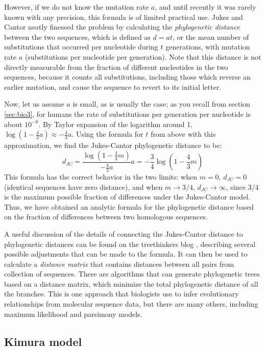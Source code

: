 \documentclass[
  letterpaper,
  DIV=11,
  numbers=noendperiod]{scrreprt}
\begin{document}
However, if we do not know the mutation rate \(a\), and until recently
it was rarely known with any precision, this formula is of limited
practical use. Jukes and Cantor neatly finessed the problem by
calculating the \emph{phylogenetic distance} between the two sequences,
which is defined as \(d = a t\), or the mean number of substitutions
that occurred per nucleotide during \(t\) generations, with mutation
rate \(a\) (substitutions per nucleotide per generation). Note that this
distance is not directly measurable from the fraction of different
nucleotides in the two sequences, because it counts all substitutions,
including those which reverse an earlier mutation, and cause the
sequence to revert to its initial letter.

Now, let us assume \(a\) is small, as is usually the case; as you recall
from section \ref{sec:bio3}, for humans the rate of substitutions per
generation per nucleotide is about \(10^{-8}\). By Taylor expansion of
the logarithm around 1,
\(\log (1 - \frac{4}{3} a) \approx - \frac{4}{3}a\). Using the formula
for \(t\) from above with this approximation, we find the Jukes-Cantor
phylogenetic distance to be:
\[ d_{JC} = \frac{\log (1 -  \frac{4}{3} m)}{ - \frac{4}{3}a} a =  -\frac{3}{4}\log (1 -  \frac{4}{3} m)\]
This formula has the correct behavior in the two limits: when \(m = 0\),
\(d_{JC} = 0\) (identical sequences have zero distance), and when
\(m \rightarrow 3/4\), \(d_{JC} \rightarrow \infty\), since 3/4 is the
maximum possible fraction of differences under the Jukes-Cantor model.
Thus, we have obtained an analytic formula for the phylogenetic distance
based on the fraction of differences between two homologous sequences.

A useful discussion of the details of connecting the Jukes-Cantor
distance to phylogenetic distances can be found on the treethinkers blog
\cite{thomson_jukes_2013}, describing several possible adjustments that
can be made to the formula. It can then be used to calculate a
\emph{distance matrix} that contains distances between all pairs from
collection of sequences. There are algorithms that can generate
phylogenetic trees based on a distance matrix, which minimize the total
phylogenetic distance of all the branches. This is one approach that
biologists use to infer evolutionary relationships from molecular
sequence data, but there are many others, including maximum likelihood
and parsimony models.

\hypertarget{kimura-model}{%
\subsection{Kimura model}\label{kimura-model}}
\end{document}
